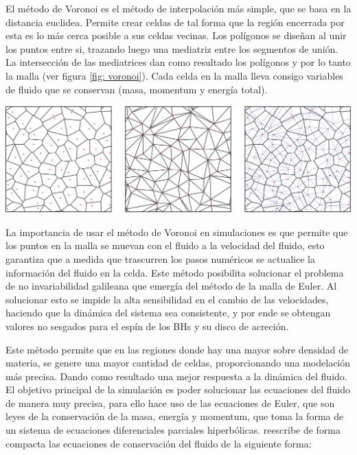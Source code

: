 El método de Voronoi es el método de interpolación más simple, que se basa en la distancia euclidea. Permite crear celdas de tal forma que la región encerrada por esta es lo más cerca posible a sus celdas vecinas. Los polígonos se diseñan al unir los puntos entre si, trazando luego una mediatriz entre los segmentos de unión. La intersección de las mediatrices dan como resultado los polígonos y por lo tanto la malla (ver figura \ref{fig: voronoi}). Cada celda en la malla lleva consigo variables de fluido que se conservan (masa, momentum y energía total).
%
\begin{center}
\includegraphics[scale=.35]{./figures/5_Algoritmo_Modelacion/voronoi.png}
\label{fig: voronoi}
\end{center}
%
La importancia de usar el método de Voronoi en simulaciones  es que permite que los puntos en la malla se muevan con el fluido a la velocidad del fluido, esto garantiza que a medida que trascurren los pasos numéricos se actualice la información del fluido en la celda. Este método posibilita solucionar el problema de no invariabilidad galileana que emergía del método de la malla de Euler. Al solucionar esto se impide la alta sensibilidad en el cambio de las velocidades, haciendo que la dinámica del sistema sea consistente, y por ende se obtengan valores no sesgados para  el espín de los BHs y su disco de acreción.  

Este método permite que en las regiones donde hay una mayor sobre densidad de materia, se genere una mayor cantidad de celdas, proporcionando una modelación más precisa. Dando como resultado una mejor respuesta a la dinámica del fluido.
El objetivo principal de la simulación es poder solucionar las ecuaciones del fluido de manera muy precisa, para ello hace uso de las ecuaciones de Euler, que son leyes de la conservación de la masa, energía y momentum, que toma la forma de un sistema de ecuaciones diferenciales parciales hiperbólicas. \cite{springel2010} reescribe de forma compacta las ecuaciones de conservación del fluido de la siguiente forma:


